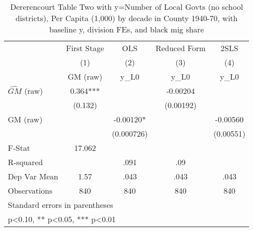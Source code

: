 \begin{table}[htbp]\centering
\def\sym#1{\ifmmode^{#1}\else\(^{#1}\)\fi}
\caption{Dererencourt Table Two with y=Number of Local Govts (no school districts), Per Capita (1,000) by decade in County 1940-70, with baseline y, division FEs, and black mig share}
\begin{tabular}{l*{4}{c}}
\toprule
                    & First Stage   &         OLS   &Reduced Form   &        2SLS   \\
                    &\multicolumn{1}{c}{(1)}&\multicolumn{1}{c}{(2)}&\multicolumn{1}{c}{(3)}&\multicolumn{1}{c}{(4)}\\
                    &\multicolumn{1}{c}{GM  (raw)}&\multicolumn{1}{c}{y\_L0}&\multicolumn{1}{c}{y\_L0}&\multicolumn{1}{c}{y\_L0}\\
\midrule
$\hat{GM}$ (raw)    &       0.364***&               &    -0.00204   &               \\
                    &     (0.132)   &               &   (0.00192)   &               \\
\addlinespace
GM  (raw)           &               &    -0.00120*  &               &    -0.00560   \\
                    &               &  (0.000726)   &               &   (0.00551)   \\
\midrule
F-Stat              &      17.062   &               &               &               \\
R-squared           &               &        .091   &         .09   &               \\
Dep Var Mean        &        1.57   &        .043   &        .043   &        .043   \\
Observations        &         840   &         840   &         840   &         840   \\
\bottomrule
\multicolumn{5}{l}{\footnotesize Standard errors in parentheses}\\
\multicolumn{5}{l}{\footnotesize * p<0.10, ** p<0.05, *** p<0.01}\\
\end{tabular}
\end{table}
